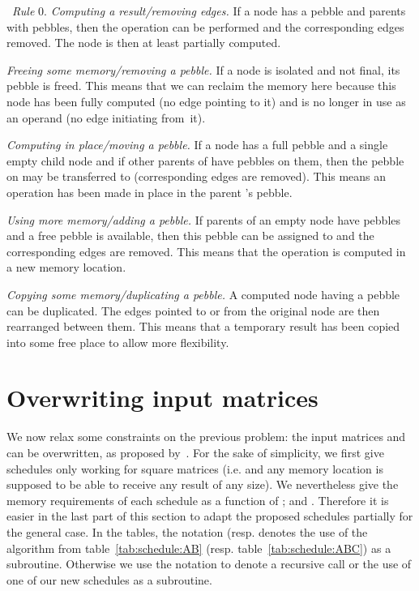 \documentclass{article}
\begin{document}
\begin{inparaenum}[{\ \xspace\emph{Rule}} 1.]
\item[{\ \xspace\emph{Rule}} 0.] \emph{Computing a result/removing edges.} If a node
has a pebble and parents with pebbles, then the operation can be
performed and the corresponding edges removed. The node is
then at least partially computed.

\item \emph{Freeing some memory/removing a pebble.} If a node is
isolated and not final, its pebble is freed. This means that
we can reclaim the memory here because this node has been fully
computed (no edge pointing to it) and is no longer in use as an
operand (no edge initiating from~it).

\item \emph{Computing in place/moving a pebble.} If a node  has
a full pebble and a single empty child node  and if other
parents of  have pebbles on them, then the pebble on  may
be transferred  to  (corresponding edges are removed). This
means an operation has been made in place in the parent 's pebble.

\item \emph{Using more memory/adding a pebble.} If parents of an empty node  have
pebbles and a free pebble is available, then this pebble can be assigned to  and the
corresponding edges are removed. This means that the operation is
computed in a new memory location.

\item \emph{Copying some memory/duplicating a pebble.} 
A computed node having a pebble can be duplicated. The edges pointed
to or from the original node are then rearranged between them.
This means that a temporary result has been copied into some free
place to allow more flexibility.
\end{inparaenum}
\section{Overwriting input matrices}
\label{sec:overwrite}
We now relax some constraints on the previous problem: the input matrices 
and  can be overwritten, as proposed
by~\cite{Kreczmar:1976:Strassen}.
For the sake of simplicity, 
we first give schedules only working for square matrices (i.e. 
and any memory location is supposed to be able to receive any result
of any size).
We nevertheless give the memory requirements of
each schedule as a function of ;  and .
Therefore it is easier in the last part of this section to adapt the proposed schedules partially
for the general case. 
In the tables, the notation  (resp.  denotes the use of the algorithm from
table~\ref{tab:schedule:AB} (resp. table~\ref{tab:schedule:ABC}) as a
subroutine. Otherwise we use the notation  to
denote a recursive call or the use of one of our new schedules as a
subroutine.
\end{document}
